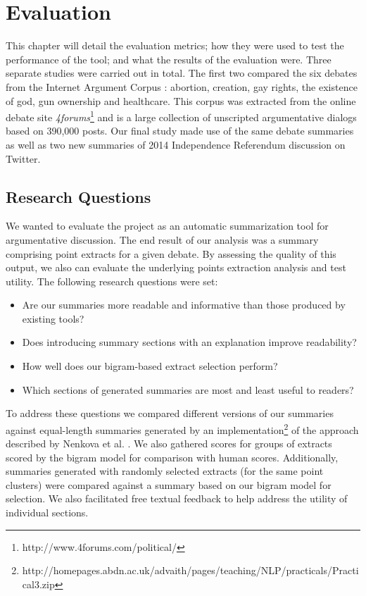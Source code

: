 \chapter{Evaluation\label{chap:evaluation}}

  This chapter will detail the evaluation metrics; how they were used to test the performance of the tool; and what the results of the evaluation were. Three separate studies were carried out in total. The first two compared the six debates from the Internet Argument Corpus \cite{walker2012corpus}: abortion, creation, gay rights, the existence of god, gun ownership and healthcare. This corpus was extracted from the online debate site \textit{4forums}\footnote{http://www.4forums.com/political/} and is a large collection of unscripted argumentative dialogs based on 390,000 posts. Our final study made use of the same debate summaries as well as two new summaries of 2014 Independence Referendum discussion on Twitter.

  \section{Research Questions}
    We wanted to evaluate the project as an automatic summarization tool for argumentative discussion. The end result of our analysis was a summary comprising point extracts for a given debate. By assessing the quality of this output, we also can evaluate the underlying points extraction analysis and test utility. The following research questions were set:

    \begin{itemize}
      \item{Are our summaries more readable and informative than those produced by existing tools?}
      \item{Does introducing summary sections with an explanation improve readability?}
      \item{How well does our bigram-based extract selection perform?}
      \item{Which sections of generated summaries are most and least useful to readers?}
    \end{itemize}

    To address these questions we compared different versions of our summaries against equal-length summaries generated by an implementation\footnote{http://homepages.abdn.ac.uk/advaith/pages/teaching/NLP/practicals/Practical3.zip} of the approach described by Nenkova et al. \cite{nenkova2006compositional}. We also gathered scores for groups of extracts scored by the bigram model for comparison with human scores. Additionally, summaries generated with randomly selected extracts (for the same point clusters) were compared against a summary based on our bigram model for selection. We also facilitated free textual feedback to help address the utility of individual sections.

